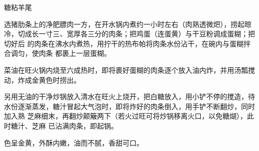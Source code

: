 %
%
%
%
%
%
%
\begin{recipe}{糖粘羊尾}

\ingredients


\preparation

\step 选猪肋条上的净肥膘肉一方，在开水锅内煮约一小时左右（肉熟透微𤆵），捞起晾
冷，切成长一寸三、宽厚各三分的肉条；把鸡蛋（连蛋黄）与干豆粉调成蛋糊；把切好后
的肉条在沸水内煮热，用拧干的热布帕将肉条水份沾干，在碗内与蛋糊拌合调匀，使肉条
都裹上一层蛋糊。

\step 菜油在旺火锅内烧至六成热时，即将裹好蛋糊的肉条逐个放入油内炸，并用汤瓢搅
动，炸成金黄色时捞出。

\step 另用无油的干净炒锅放入清水在旺火上烧开，把白糖放入，用小铲不停的搅造，待
水份逐渐蒸发，糖汁冒起大气泡时，即将炸好的肉条倒入，用手铲不断翻炒，同时加入熟
芝麻细末，再翻炒颠簸两下（若火过旺可将炒锅移离火口，以免糖煳），此时糖汁、芝麻
已沾满肉条，即起锅。

\features

色呈金黄，外酥内嫩，油而不腻，香甜可口。

\end{recipe}

